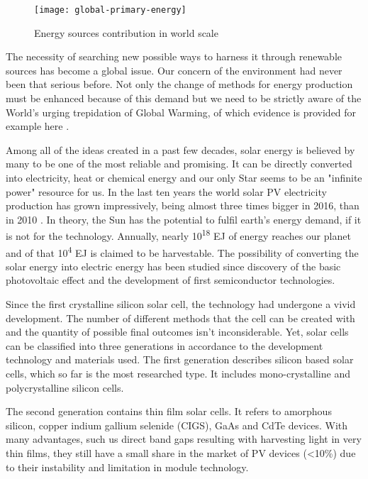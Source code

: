 \begin{figure}[H]
\centering
\texttt{[image: global-primary-energy]}
\caption{Energy sources contribution in world scale
\cite{2019}}
\label{fig:ensour}
\end{figure}

\noindent The necessity of searching new possible ways to harness it through renewable sources has become a global issue. Our concern of the environment had never been that serious before. Not only the change of methods for energy production must be enhanced because of this demand but we need to be strictly aware of the World's urging trepidation of Global Warming, of which evidence is provided for example here \cite{Nasa2019}.

\noindent Among all of the ideas created in a past few decades, solar energy is
believed by many to be one of the most reliable and promising. It can be
directly converted into electricity, heat or chemical energy and our
only Star seems to be an "infinite power" resource for us. In the last ten
years the world solar PV electricity production has grown impressively,
being almost three times bigger in 2016, than in 2010 \cite{2018}. In theory,
the Sun has the potential to fulfil earth's energy demand, if it is not
for the technology. Annually, nearly 10\textsuperscript{18} EJ of energy
reaches our planet and of that 10\textsuperscript{4} EJ is claimed to be
harvestable. The possibility of converting the solar energy into
electric energy has been studied since discovery of the basic
photovoltaic effect and the development of first semiconductor technologies.

Since the first crystalline silicon solar cell, the technology had undergone a vivid development. The number of different methods that the cell can be created with and the quantity of possible final outcomes isn't inconsiderable. Yet, solar cells can be classified into three generations in accordance to the development technology and materials used\cite{HuashangRao2018}. The first generation describes silicon based solar cells, which so far is the most researched type. It includes mono-crystalline and polycrystalline silicon cells.

The second generation contains thin film solar cells. It refers to amorphous silicon, copper indium gallium selenide (CIGS), GaAs and CdTe devices. With many advantages, such us direct band gaps resulting with harvesting light in very thin films, they still have a small share in the market of PV devices (<10\%) due to their instability and limitation in module technology\cite{HuashangRao2018}.

